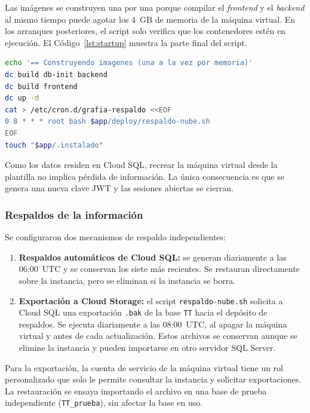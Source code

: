 Las imágenes se construyen una por una porque compilar el \textit{frontend} y el \textit{backend} al mismo tiempo puede agotar los 4~GB de memoria de la máquina virtual. En los arranques posteriores, el script solo verifica que los contenedores estén en ejecución. El Código~\ref{lst:startup} muestra la parte final del script.

\begin{lstlisting}[language=bash, caption={Construccion y arranque en startup.sh}, label={lst:startup}]
echo '== Construyendo imagenes (una a la vez por memoria)'
dc build db-init backend
dc build frontend
dc up -d
cat > /etc/cron.d/grafia-respaldo <<EOF
0 8 * * * root bash $app/deploy/respaldo-nube.sh
EOF
touch "$app/.instalado"
\end{lstlisting}

Como los datos residen en Cloud SQL, recrear la máquina virtual desde la plantilla no implica pérdida de información. La única consecuencia es que se genera una nueva clave JWT y las sesiones abiertas se cierran.

\subsubsection{Respaldos de la información}

Se configuraron dos mecanismos de respaldo independientes:

\begin{enumerate}
    \item \textbf{Respaldos automáticos de Cloud SQL:} se generan diariamente a las 06:00~UTC y se conservan los siete más recientes. Se restauran directamente sobre la instancia, pero se eliminan si la instancia se borra.
    \item \textbf{Exportación a Cloud Storage:} el script \texttt{respaldo-nube.sh} solicita a Cloud SQL una exportación \texttt{.bak} de la base \texttt{TT} hacia el depósito de respaldos. Se ejecuta diariamente a las 08:00~UTC, al apagar la máquina virtual y antes de cada actualización. Estos archivos se conservan aunque se elimine la instancia y pueden importarse en otro servidor SQL Server.
\end{enumerate}

Para la exportación, la cuenta de servicio de la máquina virtual tiene un rol personalizado que solo le permite consultar la instancia y solicitar exportaciones. La restauración se ensaya importando el archivo en una base de prueba independiente (\texttt{TT\_prueba}), sin afectar la base en uso.

